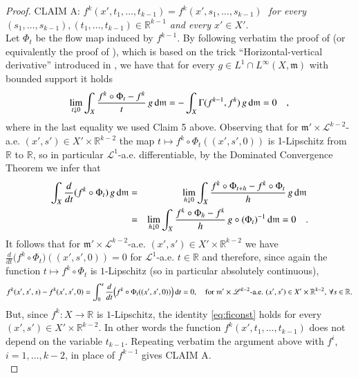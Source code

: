 \documentclass[11pt,reqno]{amsart}
\newcommand{\mm}{\mathfrak m}
\newcommand{\LL}{\mathscr{L}}
\renewcommand{\d}{{\rm{d}}}
\newcommand{\R}{\mathbb{R}}
\theoremstyle{definition}
\theoremstyle{remark}
\theoremstyle{remark}
\theoremstyle{remark}
\theoremstyle{remark}
\theoremstyle{remark}
\theoremstyle{remark}
\theoremstyle{remark}
\begin{document}
\begin{proof}
CLAIM A: \emph{$f^k(x',t_1, \ldots, t_{k-1})=f^k(x',s_1,\ldots, s_{k-1}) \;$  for every $(s_1,\ldots, s_{k-1}),(t_1,\ldots,t_{k-1}) \in \R^{k-1}$ and every $x'\in X'$}.\\
Let $\Phi_t$ be the flow map induced by $f^{k-1}$. By following verbatim the proof of \cite[Proposition 2.17]{GigliSplittingSur} (or equivalently the proof of \cite[Corollary 3.24]{GigliSplitting}), which is based on the trick ``Horizontal-vertical derivative''  introduced in \cite{AGS11b},  we have that for every $g \in L^1\cap L^\infty(X,\mm)$ with bounded support it holds
$$
\lim_{t\downarrow 0} \int_X \frac{f^k \circ \Phi_t- f^k}{t} \, g \, \d \mm= - \int_{X} \Gamma(f^{k-1},f^k) \, g \, \d \mm =0  \quad,
$$
where in  the last equality we used Claim 5 above. Observing that for $\mm'\times \LL^{k-2}$-a.e. $(x', s')\in X'\times \R^{k-2}$ the map $t\mapsto f^k\circ \Phi_{t}((x',s',0))$ is 1-Lipschitz from $\R$ to $\R$, so in particular ${\mathcal L}^1$-a.e. differentiable, by the  Dominated Convergence Theorem  we infer that
\begin{eqnarray}
\int_{X} \frac{d}{dt} (f^k \circ \Phi_t )\, g \, \d \mm&=& \lim_{h\downarrow 0}\int_{X} \frac{f^k \circ \Phi_{t+h}- f^k  \circ \Phi_{t}}{h} \, g \, \d \mm \, \nonumber \\
&=&\lim_{h\downarrow 0} \int_X \frac{f^k \circ \Phi_h- f^k}{h} \, g\circ(\Phi_t)^{-1} \, \d \mm=0  \quad .\nonumber
\end{eqnarray}
It follows that for  $\mm'\times \LL^{k-2}$-a.e. $(x', s')\in X'\times \R^{k-2}$ we have $\frac{d}{dt} \Big(f^k\circ \Phi_t\Big) ((x', s',0))=0$ for $\LL^1$-a.e. $t \in \R$ and therefore, since again the function $t\mapsto f^k \circ \Phi_t$ is $1$-Lipschitz (so in particular absolutely continuous), 
\begin{equation}\label{eq:ficonst}
f^k(x',s',s)-f^k(x',s',0)=\int_{0}^{s}  \frac{d}{dt} \Big(f^k\circ \Phi_t((x',s',0))\Big) \, \d t=0, \quad \text{for } \mm'\times \LL^{k-2}\text{-a.e. } (x', s')\in X'\times \R^{k-2}, \, \forall s \in \R.   
\end{equation}
But, since $f^k:X \to \R$ is $1$-Lipschitz, the  identity \eqref{eq:ficonst} holds for every $(x',s')\in X'\times \R^{k-2}$. In other words the function $f^k(x',t_1,\ldots,t_{k-1})$ does not depend on the variable $t_{k-1}$. Repeating verbatim the argument above with $f^{i}$, $i=1,\ldots, k-2$, in place of $f^{k-1}$ gives CLAIM A.
\\


\end{proof}
\end{document}
